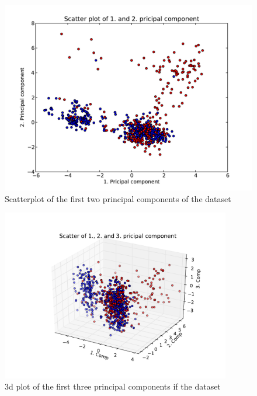 \begin{figure}
    \centering
    \includegraphics[width=\textwidth]{../sessions/15-new-principal-components-analysis/plots/scatter-principal-components-800-points.pdf}
    \caption{Scatterplot of the first two principal components of the dataset}\label{fig:pca-scatter-2d}
\end{figure}
\begin{figure}
    \centering
    \includegraphics[width=100mm,bb=90 20 500 380,clip]{../sessions/15-new-principal-components-analysis/plots/scatter-principal-components-3d-1-800points.pdf}
    \caption{3d plot of the first three principal components if the dataset}\label{fig:pca-scatter-3d}
\end{figure}

